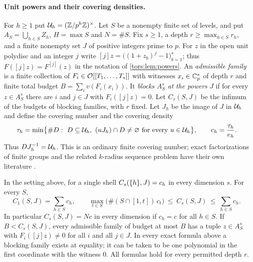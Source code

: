 \paragraph{Unit powers and their covering densities.}
For $h\ge1$ put $\mathcal{U}_h=(\mathbb{Z}/p^h\mathbb{Z})^\times$. Let $S$ be a nonempty finite set of levels, and put
$A_S=\bigcup_{h\in S}Z_h$, $H=\max S$ and $N=\#S$. Fix $s\ge1$, a depth
$r\ge\max_{h\in S}r_h$, and a finite nonempty set $J$ of positive integers prime to $p$.
For $z$ in the open unit polydisc and an integer $j$ write
$[j]z=\bigl((1+z_b)^j-1\bigr)_{b=1}^s$; thus $F([j]z)=F^{[j]}(z)$ in the notation of
\cref{tors:lem:powers}. An \emph{admissible family} is a finite collection of
$F_i\in\mathcal{O}[[T_1,\dots,T_s]]$ with witnesses $x_i\in\mathbb{C}_p^s$ of depth $r$ and finite total
budget $B=\sum_iv(F_i(x_i))$. It \emph{blocks $A_S^s$ at the powers $J$} if for every
$z\in A_S^s$ there are $i$ and $j\in J$ with $F_i([j]z)=0$. Let $C_s(S,J)$ be the infimum
of the budgets of blocking families, with $r$ fixed. Let $J_h$ be the image of $J$ in
$\mathcal{U}_h$ and define the covering number and the covering density
\[
  \tau_h=\min\bigl\{\#D:\ D\subseteq\torsU_h,\ (uJ_h)\cap D\ne\varnothing\text{ for every }
  u\in\torsU_h\bigr\},\qquad c_h=\frac{\tau_h}{e_h}.
\]
Thus $DJ_h^{-1}=\mathcal{U}_h$. This is an ordinary finite covering number; exact factorizations
of finite groups and the related $k$-radius sequence problem have their own literature
\cite{BlackburnMcKee2012Constructing}.

\begin{theorem}\label{tors:thm:cover}
In the setting above, for a single shell $C_s(\{h\},J)=c_h$ in every dimension $s$. For
every $S$,
\[
  C_1(S,J)=\sum_{h\in S}c_h,\qquad
  \max_{t\in S}\bigl(\#(S\cap[1,t])\,c_t\bigr)\ \le\ C_s(S,J)\ \le\ \sum_{h\in S}c_h .
\]
In particular $C_s(S,J)=Nc$ in every dimension if $c_h=c$ for all $h\in S$. If $B<C_s(S,J)$,
every admissible family of budget at most $B$ has a tuple $z\in A_S^s$ with
$F_i([j]z)\ne0$ for all $i$ and all $j\in J$. In every exact formula above a blocking
family exists at equality; it can be taken to be one polynomial in the first coordinate
with the witness $0$. All formulas hold for every permitted depth $r$.
\end{theorem}

